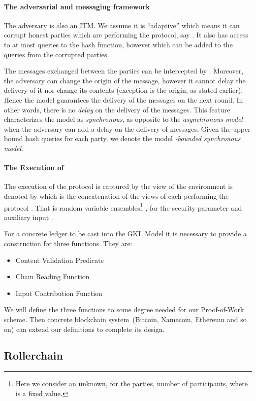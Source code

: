 \documentclass[conference,compsoc]{IEEEtran}
\begin{document}
\paragraph{\bf The adversarial and messaging framework} 
The adversary  is also an ITM. We assume it is ``adaptive'' which means it can corrupt honest parties  which are performing the protocol, say  . It also has access to at most  queries to the hash function, however which can be added to the queries from the corrupted parties. 

The messages exchanged between the parties  can be intercepted by . Moreover, the adversary can change the origin of the message, however it cannot delay the delivery of it nor change its contents (exception is the origin, as stated earlier). Hence the model guarantees the delivery of the messages on the next round. In other words, there is no {\it delay} on the delivery of the messages. This feature characterizes the model as {\it synchronous}, as opposite to the {\it asynchronous model} when the adversary can add a delay on the delivery of messages. Given the  upper bound  hash queries for each party, we denote the model {\it -bounded synchronous model}.

\paragraph{\bf The Execution of }
The execution of the protocol  is captured by the view of the environment  is denoted by  which is the concatenation of the views of each   performing the protocol . That is  random variable ensembles\footnote{Here we consider an unknown, for the parties, number of  participants, where  is a fixed value.} , for the security parameter  and auxiliary input .

For a concrete ledger to be cast into the GKL Model it is necessary to provide a construction for three functions. They are:
\begin{itemize}
\item Content Validation Predicate  
\item Chain Reading Function 
\item Input Contribution Function 
\end{itemize}

We will define the three functions to some degree needed for our Proof-of-Work scheme. Then concrete blockchain system~(Bitcoin, Namecoin, Ethereum and so on) can extend our definitions to complete its design. 

\subsection{Rollerchain}
\end{document}
